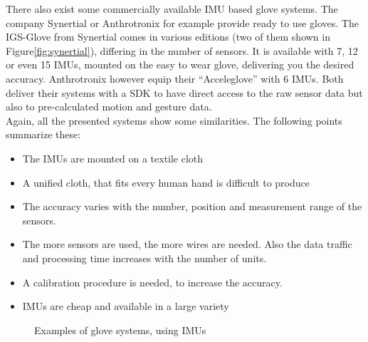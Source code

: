 There also exist some commercially available \ac{IMU} based glove systems. The company Synertial \cite{Synertial} or Anthrotronix \cite{anthrotronix} for example provide ready to use gloves. The IGS-Glove from Synertial comes in various editions (two of them shown in Figure\ref{fig:synertial}), differing in the number of sensors. It is available with 7, 12 or even 15 \acp{IMU}, mounted on the easy to wear glove, delivering you the desired accuracy. Anthrotronix however equip their ``Acceleglove'' with 6 \acp{IMU}. Both deliver their systems with a \acs{SDK} to have direct access to the raw sensor data but also to pre-calculated motion and gesture data.\\

Again, all the presented systems show some similarities. The following points summarize these:
\begin{itemize}
\item The \acp{IMU} are mounted on a textile cloth
\item A unified cloth, that fits every human hand is difficult to produce
\item The accuracy varies with the number, position and measurement range of the sensors.
\item The more sensors are used, the more wires are needed. Also the data traffic and processing time increases with the number of units.
\item A calibration procedure is needed, to increase the accuracy.
\item IMUs are cheap and available in a large variety
\end{itemize}

\begin{figure}[h]
	\hfill
	
	\caption[Glove systems using IMUs]{Examples of glove systems, using \acp{IMU}}
	\label{fig:examplesIMU}
\end{figure}

